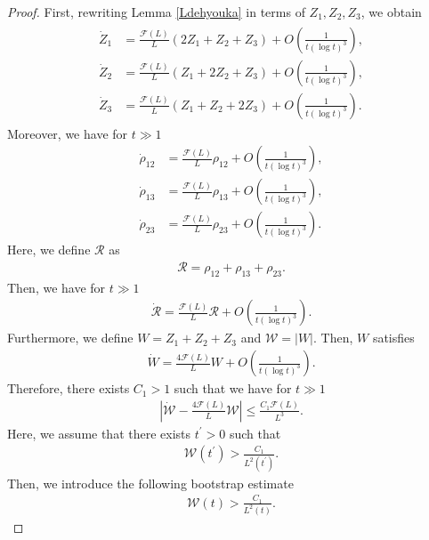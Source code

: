 \documentclass[reqno]{amsart}
\theoremstyle{plain}
\theoremstyle{definition}
\numberwithin{equation}{section}
\newcommand{\1}{\mathbbm{1}}
\begin{document}
\begin{proof}
First, rewriting Lemma \ref{Ldehyouka} in terms of $Z_1,Z_2,Z_3$, we obtain
\begin{align}\label{Zkei}
\begin{aligned}
\dot{Z}_1&=\frac{\mathcal{F}(L)}{L}(2Z_1+Z_2+Z_3)+O\left(\frac{1}{t(\log{t})^{3}}\right),
\\
\dot{Z}_2&=\frac{\mathcal{F}(L)}{L}(Z_1+2Z_2+Z_3)+O\left(\frac{1}{t(\log{t})^{3}}\right),
\\
\dot{Z}_3&=\frac{\mathcal{F}(L)}{L}(Z_1+Z_2+2Z_3)+O\left(\frac{1}{t(\log{t})^{3}}\right).
\end{aligned}
\end{align}
Moreover, we have for $t\gg 1$
\begin{align*}
\dot{\rho}_{12}&=\frac{\mathcal{F}(L)}{L}\rho_{12}+O\left(\frac{1}{t(\log{t})^{3}}\right),
\\
\dot{\rho}_{13}&=\frac{\mathcal{F}(L)}{L}\rho_{13}+O\left(\frac{1}{t(\log{t})^{3}}\right),
\\
\dot{\rho}_{23}&=\frac{\mathcal{F}(L)}{L}\rho_{23}+O\left(\frac{1}{t(\log{t})^{3}}\right).
\end{align*}
Here, we define $\mathcal{R}$ as 
\begin{align}\label{Rdef}
\mathcal{R}=\rho_{12}+\rho_{13}+\rho_{23}.
\end{align}
Then, we have for $t\gg 1$
\begin{align}\label{Rkei}
\dot{\mathcal{R}}=\frac{\mathcal{F}(L)}{L}\mathcal{R}+O\left(\frac{1}{t(\log{t})^{3}}\right).
\end{align}
Furthermore, we define $W=Z_1+Z_2+Z_3$ and $\mathcal{W}=|W|$. Then, $W$ satisfies
\begin{align*}
\dot{W}=\frac{4\mathcal{F}(L)}{L}W+O\left(\frac{1}{t(\log{t})^{3}}\right).
\end{align*}
Therefore, there exists $C_1>1$ such that we have for $t\gg 1$
\begin{align}\label{Wkei}
\left|\dot{\mathcal{W}}-\frac{4\mathcal{F}(L)}{L}\mathcal{W}\right|\leq \frac{C_1\mathcal{F}(L)}{L^3}.
\end{align}
Here, we assume that there exists $t^{\prime}>0$ such that 
\begin{align}\label{dekaikatei}
\mathcal{W}(t^{\prime})>\frac{C_1}{L^2(t^{\prime})}.
\end{align}
Then, we introduce the following bootstrap estimate
\begin{align}\label{Wbs}
\mathcal{W}(t)>\frac{C_1}{L^2(t)}.
\end{align}

\end{proof}
\end{document}
